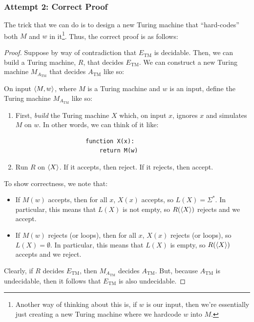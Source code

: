 \documentclass[letterpaper]{article}
\begin{document}
\subsubsection{Attempt 2: Correct Proof}
The trick that we can do is to design a new Turing machine that ``hard-codes'' both $M$ and $w$ in it\footnote{Another way of thinking about this is, if $w$ is our input, then we're essentially just creating a new Turing machine where we hardcode $w$ into $M$.}. Thus, the correct proof is as follows: 
\begin{mdframed}[]
    \begin{proof}
        Suppose by way of contradiction that $E_{\text{TM}}$ is decidable. Then, we can build a Turing machine, $R$, that decides $E_{\text{TM}}$. We can construct a new Turing machine $M_{A_{\text{TM}}}$ that decides $A_{\text{TM}}$ like so: 
        \begin{mdframed}[]
            On input $\langle M, w \rangle$, where $M$ is a Turing machine and $w$ is an input, define the Turing machine $M_{A_{\text{TM}}}$ like so: 
    
            \begin{enumerate}
                \item First, \emph{build} the Turing machine $X$ which, on input $x$, ignores $x$ and simulates $M$ on $w$. In other words, we can think of it like:\begin{verbatim}
                    function X(x):
                        return M(w)\end{verbatim}
                \item Run $R$ on $\langle X \rangle$. If it accepts, then reject. If it rejects, then accept. 
            \end{enumerate}
        \end{mdframed}
        To show correctness, we note that: 
        \begin{itemize}
            \item If $M(w)$ accepts, then for all $x$, $X(x)$ accepts, so $L(X) = \Sigma^*$. In particular, this means that $L(X)$ is not empty, so $R(\langle X \rangle)$ rejects and we accept. 
            \item If $M(w)$ rejects (or loops), then for all $x$, $X(x)$ rejects (or loops), so $L(X) = \emptyset$. In particular, this means that $L(X)$ is empty, so $R(\langle X \rangle)$ accepts and we reject. 
        \end{itemize}
        Clearly, if $R$ decides $E_{\text{TM}}$, then $M_{A_{\text{TM}}}$ decides $A_{\text{TM}}$. But, because $A_{\text{TM}}$ is undecidable, then it follows that $E_{\text{TM}}$ is also undecidable. 
    \end{proof}
\end{mdframed}
\end{document}

